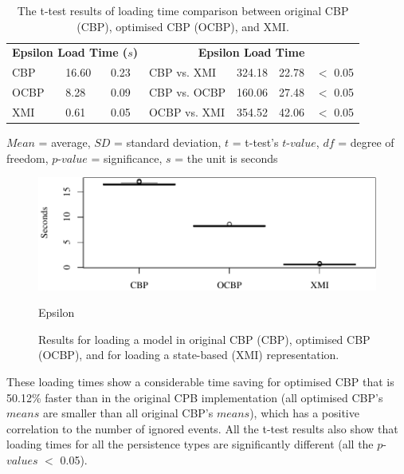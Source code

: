 \documentclass{llncs}
\begin{document}
{\begin{table}[ht]
\footnotesize
\centering
\caption{The t-test results of loading time comparison between original CBP (CBP), optimised CBP (OCBP), and XMI.}
\label{table:ttest_results_loadtime}
\begin{tabular}
{|p{}p{}p{}|p{}p{}p{}p{}|}
\hline 
\multicolumn{3}{|c|}{\textbf{Epsilon Load Time ($s$)}} & \multicolumn{4}{c|}{\textbf{Epsilon Load Time}} \\
CBP & 16.60    & 0.23 &  CBP vs. XMI & 324.18   &22.78 & $<$ 0.05 \\
OCBP &  8.28  &  0.09 & CBP vs. OCBP & 160.06 & 27.48 & $<$ 0.05 \\  
XMI & 0.61   & 0.05 & OCBP vs. XMI & 354.52   &42.06  & $<$ 0.05 \\ 
\hline 

\end{tabular}
\justify
$Mean$ = average, $SD$ = standard deviation, $t$ = t-test's $t$-$value$, $df$ = degree of freedom, $p$-$value$ = significance, $s$ = the unit is seconds
\end{table}

\begin{figure}[ht]
        \centering
        \includegraphics[width=\linewidth]{images/load_time_epsilon}
        \caption{Epsilon}
        \label{fig:load_time_epsilon}
    \caption{Results for loading a model in original CBP (CBP), optimised CBP (OCBP), and for loading a state-based (XMI) representation.}
    \label{fig:loadtime}
\end{figure}


These loading times show a considerable time saving for optimised CBP that is 50.12\% faster than in the original CPB implementation (all optimised CBP's $means$ are  smaller than all original CBP's $means$), which has a positive correlation to the number of ignored events. All the t-test results also show that loading times for all the persistence types are significantly different (all the $p$-$values$ $<$ 0.05). 

}
\end{document}
